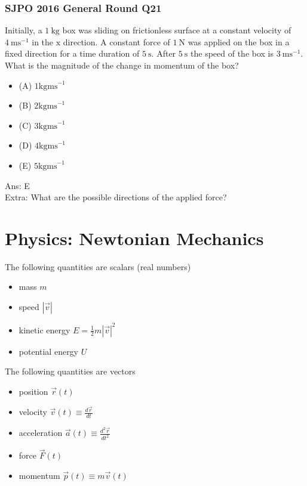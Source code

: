 \documentclass{article}
\begin{document}
\begin{samepage}
\subsubsection{SJPO 2016 General Round Q21}
Initially, a $1\mathrm{~kg}$ box was sliding on frictionless surface at a constant velocity of $4\mathrm{~ms}^{-1}$ in the $\mathrm{x}$ direction. A constant force of $1\mathrm{~N}$ was applied on the box in a fixed direction for a time duration of $5\mathrm{~s}$. After $5\mathrm{~s}$ the speed of the box is $3\mathrm{~ms}^{-1}$. What is the magnitude of the change in momentum of the box?
\begin{itemize}
\item[](A) $1 \mathrm{kgms}^{-1}$
\item[](B) $2 \mathrm{kgms}^{-1}$
\item[](C) $3 \mathrm{kgms}^{-1}$
\item[](D) $4 \mathrm{kgms}^{-1}$
\item[](E) $5 \mathrm{kgms}^{-1}$
\end{itemize}
Ans: \ifpaper E \fi \\[10pt]
Extra: What are the possible directions of the applied force? 
\end{samepage}
\newpage
\section{Physics: Newtonian Mechanics}
The following quantities are scalars (real numbers)
\begin{itemize}
    \item mass $m$
    \item speed $|\vec{v}|$
    \item kinetic energy $E = \frac{1}{2} m|\vec{v}|^2$
    \item potential energy $U$
\end{itemize}
The following quantities are vectors
\begin{itemize}
    \item position $\vec{r}(t)$
    \item velocity $\vec{v}(t) \equiv \frac{d\vec{r}}{dt}$
    \item acceleration $\vec{a}(t) \equiv \frac{d^2\vec{r}}{dt^2}$
    \item force $\vec{F}(t)$
    \item momentum $\vec{p}(t) \equiv m\vec{v}(t)$
\end{itemize}
\leavevmode \\
\end{document}
